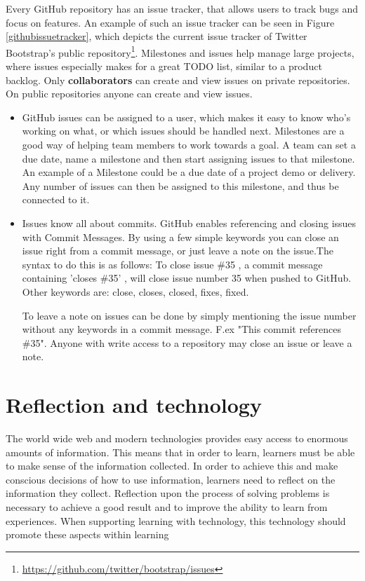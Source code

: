 Every GitHub repository has an issue tracker, that allows users to track bugs and focus on features. An example of such an issue tracker can be seen in Figure \ref{githubissuetracker}, which depicts the current issue tracker of Twitter Bootstrap's public repository\footnote{\url{https://github.com/twitter/bootstrap/issues}}. Milestones and issues help manage large projects, where issues especially makes for a great TODO list, similar to a product backlog. Only {\bf collaborators} can create and view issues on private repositories. On public repositories anyone can create and view issues. 
\begin{itemize}
\item GitHub issues can be assigned to a user, which makes it easy to know who's working on what, or which issues should be handled next. Milestones are a good way of helping team members to work towards a goal. A team can set a due date, name a milestone and then start assigning issues to that milestone. An example of a Milestone could be a due date of a project demo or delivery. Any number of issues can then be assigned to this milestone, and thus be connected to it. 
\item Issues know all about commits. GitHub enables referencing and closing issues with Commit Messages. By using a few simple keywords you can close an issue right from a commit message, or just leave a note on the issue.The syntax to do this is as follows: To close issue \#35 , a commit message containing 'closes \#35' , will close issue number 35 when pushed to GitHub. Other keywords are: close, closes, closed, fixes, fixed. 

To leave a note on issues can be done by simply mentioning the issue number without any keywords in a commit message. F.ex "This commit references \#35". Anyone with write access to a repository may close an issue or leave a note.
\end{itemize}

\section{Reflection and technology}
The world wide web and modern technologies provides easy access to enormous amounts of information. This means that in order to learn, learners must be able to make sense of the information collected.  
In order to achieve this and make conscious decisions of how to use information, learners need to reflect on the information they collect. Reflection upon the process of solving problems is necessary to achieve a good result and to improve the ability to learn from experiences. When supporting learning with technology, this technology should promote these aspects within learning\citep{Lin1999}

